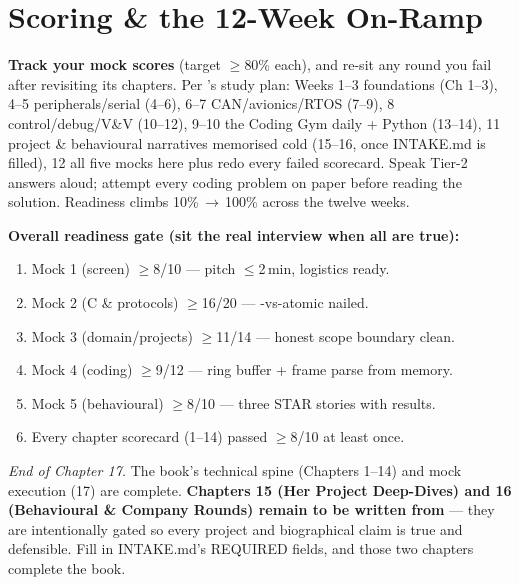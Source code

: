 \section{Scoring \& the 12-Week On-Ramp}
\begin{partnote}
\textbf{Track your mock scores} (target $\ge$80\% each), and re-sit any round you
fail after revisiting its chapters. Per 's study plan: Weeks 1--3
foundations (Ch 1--3), 4--5 peripherals/serial (4--6), 6--7 CAN/avionics/RTOS
(7--9), 8 control/debug/V\&V (10--12), 9--10 the Coding Gym daily + Python
(13--14), 11 project \& behavioural narratives memorised cold (15--16, once
INTAKE.md is filled), 12 all five mocks here plus redo every failed scorecard.
Speak Tier-2 answers aloud; attempt every coding problem on paper before reading
the solution. Readiness climbs 10\%\,$\rightarrow$\,100\% across the twelve
weeks.
\end{partnote}

\begin{scorecard}
\textbf{Overall readiness gate (sit the real interview when all are true):}
\begin{enumerate}
\item Mock 1 (screen) $\ge$8/10 --- pitch $\le$2\,min, logistics ready.
\item Mock 2 (C \& protocols) $\ge$16/20 --- -vs-atomic nailed.
\item Mock 3 (domain/projects) $\ge$11/14 --- honest scope boundary clean.
\item Mock 4 (coding) $\ge$9/12 --- ring buffer + frame parse from memory.
\item Mock 5 (behavioural) $\ge$8/10 --- three STAR stories with results.
\item Every chapter scorecard (1--14) passed $\ge$8/10 at least once.
\end{enumerate}
\end{scorecard}

\begin{partnote}
\emph{End of Chapter 17.} The book's technical spine (Chapters 1--14) and mock
execution (17) are complete. \textbf{Chapters 15 (Her Project Deep-Dives) and 16
(Behavioural \& Company Rounds) remain to be written from
} --- they are intentionally gated so every project and
biographical claim is true and defensible. Fill in INTAKE.md's REQUIRED fields,
and those two chapters complete the book.
\end{partnote}
